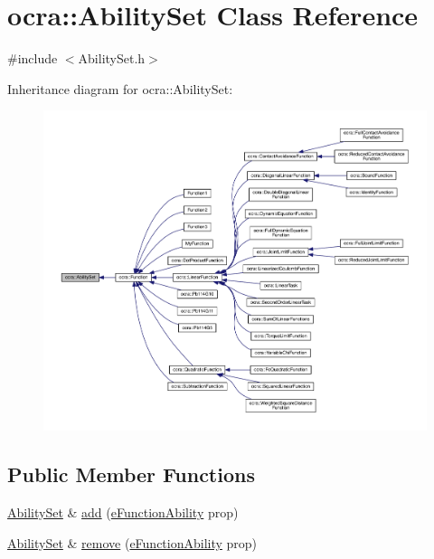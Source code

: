 \hypertarget{classocra_1_1AbilitySet}{}\section{ocra\+:\+:Ability\+Set Class Reference}
\label{classocra_1_1AbilitySet}


{\ttfamily \#include $<$Ability\+Set.\+h$>$}



Inheritance diagram for ocra\+:\+:Ability\+Set\+:\nopagebreak
\begin{figure}[H]
\begin{center}
\leavevmode
\includegraphics[width=350pt]{d4/d5b/classocra_1_1AbilitySet__inherit__graph}
\end{center}
\end{figure}
\subsection*{Public Member Functions}
\begin{DoxyCompactItemize}
\item 
\hyperlink{classocra_1_1AbilitySet}{Ability\+Set} \& \hyperlink{classocra_1_1AbilitySet_a4ce141c59ed38f812a4216730a0c4685}{add} (\hyperlink{namespaceocra_a40ddbec106a6034cd2047bba9945b568}{e\+Function\+Ability} prop)
\item 
\hyperlink{classocra_1_1AbilitySet}{Ability\+Set} \& \hyperlink{classocra_1_1AbilitySet_a093633f29e0d5e6a388d9b8cba9224c7}{remove} (\hyperlink{namespaceocra_a40ddbec106a6034cd2047bba9945b568}{e\+Function\+Ability} prop)
\end{DoxyCompactItemize}
